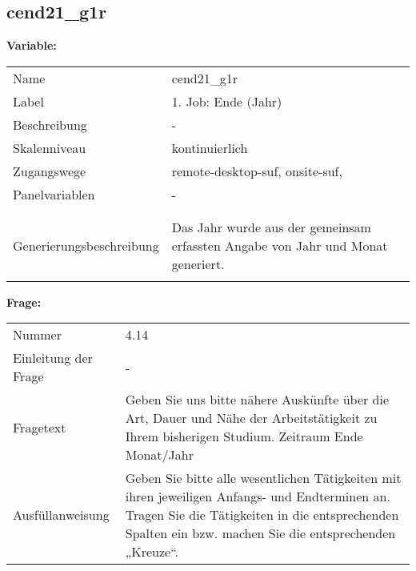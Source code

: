 	
	
	\subsection{cend21\_g1r}
	\label{subSection:cend21_g1r}

	\noindent\textbf{Variable:}\\
		\begin{tabular}{lL{11.3cm}}
			\label{tableVariable:cend21_g1r}
			Name & cend21\_g1r \\
			Label & 1. Job: Ende (Jahr) \\
			Beschreibung & - \\
			Skalenniveau & kontinuierlich \\
			Zugangswege &
				remote-desktop-suf,
				onsite-suf,
 \\
			Panelvariablen & -
			 \\
			 \\
 \\
					Generierungsbeschreibung & Das Jahr wurde aus der gemeinsam erfassten Angabe von Jahr und Monat generiert. 
				 \\	
			 \\
		\end{tabular}

		\vspace*{1 cm}
		\noindent\textbf{Frage:}\\
		\begin{tabular}{lL{11.3cm}}
			\label{tableQuestion:cend21_g1r}
			Nummer & 4.14 \\
			Einleitung der Frage & - \\
			Fragetext & Geben Sie uns bitte nähere Auskünfte über die Art, Dauer und Nähe der Arbeitstätigkeit zu Ihrem bisherigen Studium.
Zeitraum
Ende Monat/Jahr \\
			Ausfüllanweisung & Geben Sie bitte alle wesentlichen Tätigkeiten mit ihren jeweiligen Anfangs- und Endterminen an. Tragen Sie die Tätigkeiten in die entsprechenden Spalten ein bzw. machen Sie die entsprechenden „Kreuze“. \\
		\end{tabular}




